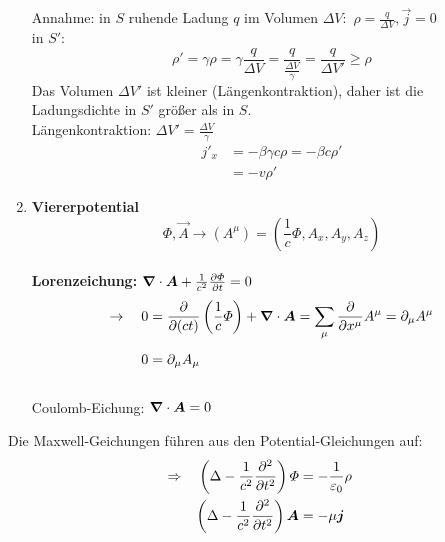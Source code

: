 \begin{enumerate}[1)]
	Annahme: in $ S $ ruhende Ladung $ q $ im Volumen $ \Delta V: $ $ \rho = \frac{q}{\Delta V} , \vec{j} = 0 $\\[5pt]
	in $ S' $:
	\begin{equation*}
	\rho' = \gamma \rho = \gamma \frac{q}{\Delta V} = \frac{q}{\frac{\Delta V}{\gamma}} = \frac{q}{\Delta V'} \ge \rho
	\end{equation*}
	Das Volumen $ \Delta V' $ ist kleiner (Längenkontraktion), daher ist die Ladungsdichte in $ S' $ größer als in $ S $.\\
	Längenkontraktion: $ \Delta V' = \frac{\Delta V}{\gamma} $
	\begin{align*}
	j'_x &= - \beta \gamma c \rho = - \beta c \rho'\\
	&= - v \rho'
	\end{align*}
	\item \textbf{Viererpotential}
	\begin{equation*}
	\Phi, \vec{A} \to (A^{\mu}) = (\frac{1}{c} \Phi, A_x, A_y, A_z)
	\end{equation*}
	\\[5pt]
	\textbf{Lorenzeichung:} $ \bm{\nabla} \cdot \bm{A} + \frac{1}{c^2} \frac{\partial \varPhi}{\partial t} = 0 $
	\begin{align*}
	\rightarrow \quad 0 &= \frac{\partial }{\partial (ct)} \left(\frac{1}{c} \varPhi\right) + \bm{\nabla} \cdot \bm{A} = \sum_{\mu} \frac{\partial }{\partial x^{\mu}} A^{\mu} = \partial _{\mu} A^{\mu}\\[5pt]
	0 &= \partial_{\mu} A_{\mu}
	\end{align*}
	\\[5pt]
	Coulomb-Eichung: $ \bm{\nabla} \cdot \bm{A} = 0 $
\end{enumerate}
Die Maxwell-Geichungen führen aus den Potential-Gleichungen auf:
\begin{align*}
\Rightarrow \quad \left(\Delta - \frac{1}{c^2} \frac{\partial ^2}{\partial t^2}\right) \varPhi &= - \frac{1}{\varepsilon_0} \rho \\
\left(\Delta - \frac{1}{c^2} \frac{\partial ^2}{\partial t^2}\right) \bm{A} &= - \mu \bm{j}
\end{align*}

